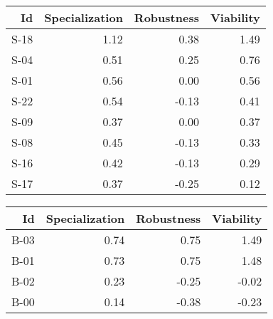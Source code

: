 


\begin{tabular}{ | r | r | r | r | }
    \hline
                    Id  &  Specialization  &      Robustness  &       Viability  \\
    \hline
    \hline
                  S-18  &            1.12  &            0.38  &            1.49  \\
    \hline
                  S-04  &            0.51  &            0.25  &            0.76  \\
    \hline
                  S-01  &            0.56  &            0.00  &            0.56  \\
    \hline
                  S-22  &            0.54  &           -0.13  &            0.41  \\
    \hline
                  S-09  &            0.37  &            0.00  &            0.37  \\
    \hline
                  S-08  &            0.45  &           -0.13  &            0.33  \\
    \hline
                  S-16  &            0.42  &           -0.13  &            0.29  \\
    \hline
                  S-17  &            0.37  &           -0.25  &            0.12  \\
    \hline
\end{tabular}


\begin{tabular}{ | r | r | r | r | }
    \hline
                    Id  &  Specialization  &      Robustness  &       Viability  \\
    \hline
    \hline
                  B-03  &            0.74  &            0.75  &            1.49  \\
    \hline
                  B-01  &            0.73  &            0.75  &            1.48  \\
    \hline
                  B-02  &            0.23  &           -0.25  &           -0.02  \\
    \hline
                  B-00  &            0.14  &           -0.38  &           -0.23  \\
    \hline
\end{tabular}


